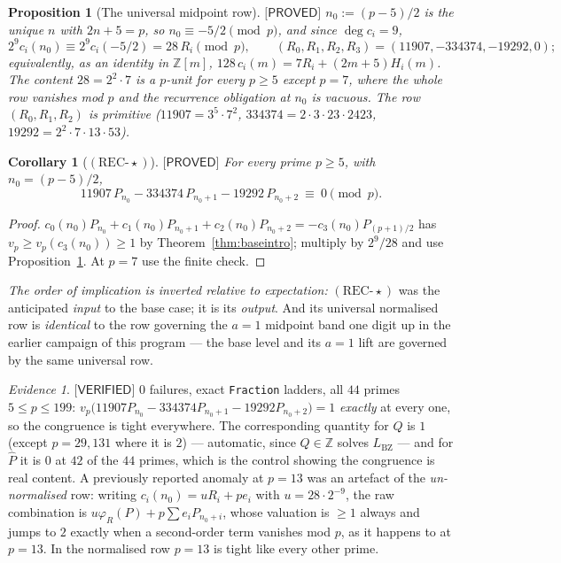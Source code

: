 \documentclass[11pt,reqno]{amsart}
\theoremstyle{plain}
\newtheorem{proposition}[theorem]{Proposition}
\newtheorem{corollary}[theorem]{Corollary}
\theoremstyle{definition}
\theoremstyle{remark}
\newtheorem{evidence}[theorem]{Evidence}
\numberwithin{equation}{section}
\newcommand{\ZZ}{\mathbb{Z}}
\newcommand{\LBZ}{L_{\mathrm{BZ}}}
\newcommand{\PROVED}{\textsf{[PROVED]}}
\newcommand{\VERIFIED}{\textsf{[VERIFIED]}}
\begin{document}
\begin{proposition}[The universal midpoint row]\label{prop:univrow}
$\PROVED$ $n_0:=(p-5)/2$ is the unique $n$ with $2n+5=p$, so $n_0\equiv-5/2\pmod p$, and since
$\deg c_i=9$,
\[
2^9c_i(n_0)\equiv2^9c_i(-5/2)=28\,R_i\pmod p,\qquad (R_0,R_1,R_2,R_3)=(11907,-334374,-19292,0);
\]
equivalently, as an identity in $\ZZ[m]$, $128\,c_i(m)=7R_i+(2m+5)H_i(m)$. The content
$28=2^2\cdot7$ is a $p$-unit for every $p\ge5$ except $p=7$, where the whole row vanishes mod
$p$ and the recurrence obligation at $n_0$ is vacuous. The row $(R_0,R_1,R_2)$ is primitive
($11907=3^5\cdot7^2$, $334374=2\cdot3\cdot23\cdot2423$, $19292=2^2\cdot7\cdot13\cdot53$).
\end{proposition}

\begin{corollary}[$(\mathrm{REC}\text{-}\star)$]\label{cor:recstar}
$\PROVED$ For every prime $p\ge5$, with $n_0=(p-5)/2$,
\[
11907\,P_{n_0}-334374\,P_{n_0+1}-19292\,P_{n_0+2}\ \equiv\ 0\pmod p .
\]
\end{corollary}

\begin{proof}
$c_0(n_0)P_{n_0}+c_1(n_0)P_{n_0+1}+c_2(n_0)P_{n_0+2}=-c_3(n_0)P_{(p+1)/2}$ has
$v_p\ge v_p(c_3(n_0))\ge1$ by Theorem~\ref{thm:baseintro}; multiply by $2^9/28$ and use
Proposition~\ref{prop:univrow}. At $p=7$ use the finite check.
\end{proof}

\emph{The order of implication is inverted relative to expectation:}
$(\mathrm{REC}\text{-}\star)$ was the anticipated \emph{input} to the base case; it is its
\emph{output}. And its universal normalised row is \emph{identical} to the row governing the
$a=1$ midpoint band one digit up in the earlier campaign of this program \cite{ProgA1MID} ---
the base level and its $a=1$ lift are governed by the same universal row.

\begin{evidence}\label{ev:recstar}
$\VERIFIED$ $0$ failures, exact \texttt{Fraction} ladders, all $44$ primes $5\le p\le199$:
$v_p\bigl(11907P_{n_0}-334374P_{n_0+1}-19292P_{n_0+2}\bigr)=1$ \emph{exactly} at every one, so
the congruence is tight everywhere. The corresponding quantity for $Q$ is $1$ (except $p=29,131$
where it is $2$) --- automatic, since $Q\in\ZZ$ solves $\LBZ$ --- and for $\hat P$ it is $0$ at
$42$ of the $44$ primes, which is the control showing the congruence is real content.
A previously reported anomaly at $p=13$ was an artefact of the \emph{un-normalised} row:
writing $c_i(n_0)=uR_i+pe_i$ with $u=28\cdot2^{-9}$, the raw combination is
$u\varphi_R(P)+p\sum e_iP_{n_0+i}$, whose valuation is $\ge1$ always and jumps to $2$ exactly
when a second-order term vanishes mod $p$, as it happens to at $p=13$. In the normalised row
$p=13$ is tight like every other prime.
\end{evidence}
\end{document}
